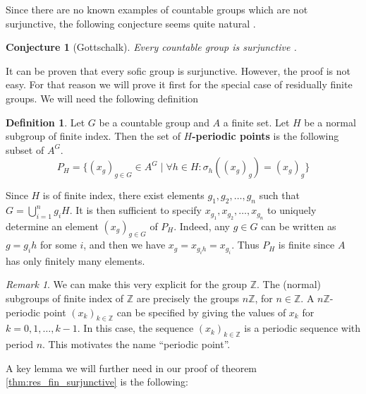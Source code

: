 \documentclass[titlepage, a4paper]{article}
\newcommand{\Z}{\mathbb{Z}}
\theoremstyle{theoremdd}
\newtheorem{conjecture}[theorem]{Conjecture}
\theoremstyle{definition}
\newtheorem{definition}[theorem]{Definition}
\theoremstyle{remark}
\newtheorem{remark}[theorem]{Remark}
\begin{document}
Since there are no known examples of countable groups which are not surjunctive, the following conjecture seems quite natural \cite[introduction]{weiss_2000}.

    \begin{conjecture}[Gottschalk] \label{conj:gottschalk}
        Every countable group is surjunctive  .
    \end{conjecture}

    It can be proven that every sofic group is surjunctive. However, the proof is not easy. For that reason we will prove it first for the special case of residually finite groups. We will need the following definition
\begin{definition}
    Let $G$ be a countable group and $A$ a finite set. Let $H$ be a normal subgroup of finite index. Then the set of \textbf{$H$-periodic points} is the following subset of $A^G$.
        \[
        P_H = \{ (x_g)_{g \in G} \in A^G  \mid \forall h \in H: \sigma_h((x_g)_g) = (x_g)_g\}
        \]
\end{definition}


Since $H$ is of finite index, there exist elements $g_1, g_2, \dots, g_n$ such that $G = \bigcup_{i=1}^n g_i H$. It is then sufficient to specify $x_{g_1}, x_{g_2}, \dots, x_{g_n}$ to uniquely determine an element $(x_g)_{g \in G}$ of $P_H$. Indeed, any $g \in G$ can be written as $g = g_ih$ for some $i$, and then we have $x_g = x_{g_ih} = x_{g_i}$. Thus $P_H$ is finite since $A$ has only finitely many elements.

\begin{remark}
We can make this very explicit for the group $\Z$. The (normal) subgroups of finite index of $\Z$ are precisely the groups $n\Z$, for $n \in \Z$. A $n\Z$-periodic point $(x_k)_{k \in \Z}$ can be specified by giving the values of $x_k$ for $k=0, 1, \dots, k-1$. In this case, the sequence 
$(x_k)_{k \in \Z}$ is a periodic sequence with period $n$. This motivates the name ``periodic point''.
\end{remark}

A key lemma we will further need in our proof of theorem \ref{thm:res_fin_surjunctive} is the following:
\end{document}
